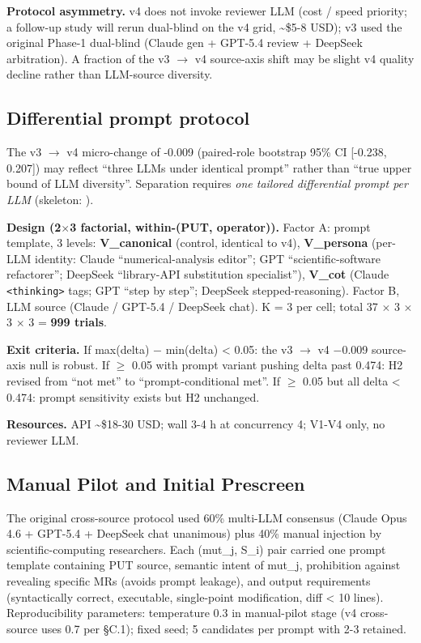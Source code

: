 \documentclass[manuscript,screen,review]{acmart}
\begin{document}
\textbf{Protocol asymmetry.} v4 does not invoke reviewer LLM (cost
/ speed priority; a follow-up study will rerun dual-blind on the v4
grid, \textasciitilde\$5-8 USD); v3 used the original Phase-1 dual-blind
(Claude gen + GPT-5.4 review + DeepSeek arbitration). A fraction of the
v3 $\to$ v4 source-axis shift may be slight v4 quality decline rather than
LLM-source diversity.

\subsection{Differential prompt protocol}\label{c.1.1-differential-prompt-protocol-future-work-commitment}

The v3 $\to$ v4 micro-change of -0.009 (paired-role bootstrap 95\% CI
[-0.238, 0.207]) may reflect ``three LLMs under
identical prompt'' rather than ``true upper bound of LLM diversity''.
Separation requires \emph{one tailored differential prompt per LLM}
(skeleton: ).

\textbf{Design (2$\times$3 factorial, within-(PUT, operator)).} Factor A:
prompt template, 3 levels: \textbf{V\_canonical} (control, identical to
v4), \textbf{V\_persona} (per-LLM identity: Claude ``numerical-analysis
editor''; GPT ``scientific-software refactorer''; DeepSeek ``library-API
substitution specialist''), \textbf{V\_cot} (Claude
\texttt{\textless{}thinking\textgreater{}} tags; GPT ``step by step'';
DeepSeek stepped-reasoning). Factor B, LLM source (Claude / GPT-5.4 /
DeepSeek chat). K = 3 per cell; total 37 $\times$ 3 $\times$ 3 $\times$ 3 = \textbf{999
trials}.

\textbf{Exit criteria.} If max(delta) $-$ min(delta) \textless{} 0.05: the
v3 $\to$ v4 $-$0.009 source-axis null is robust. If $\geq$ 0.05 with prompt variant
pushing delta past 0.474: H2 revised from ``not met'' to
``prompt-conditional met''. If $\geq$ 0.05 but all delta \textless{} 0.474:
prompt sensitivity exists but H2 unchanged.

\textbf{Resources.} API \textasciitilde\$18-30 USD; wall 3-4 h at
concurrency 4; V1-V4 only, no reviewer LLM.

\subsection{Manual Pilot and Initial Prescreen}\label{c.2-manual-pilot-lineage-llm-client-configuration-and-l0-prescreen}

The original cross-source protocol used 60\% multi-LLM consensus (Claude Opus
4.6 + GPT-5.4 + DeepSeek chat unanimous) plus 40\% manual injection by
scientific-computing researchers. Each (mut\_j, S\_i) pair carried one
prompt template containing PUT source, semantic intent of mut\_j,
prohibition against revealing specific MRs (avoids prompt leakage), and
output requirements (syntactically correct, executable, single-point
modification, diff \textless{} 10 lines). Reproducibility parameters:
temperature 0.3 in manual-pilot stage (v4 cross-source uses 0.7 per
§C.1); fixed seed; 5 candidates per prompt with 2-3 retained.
\end{document}
